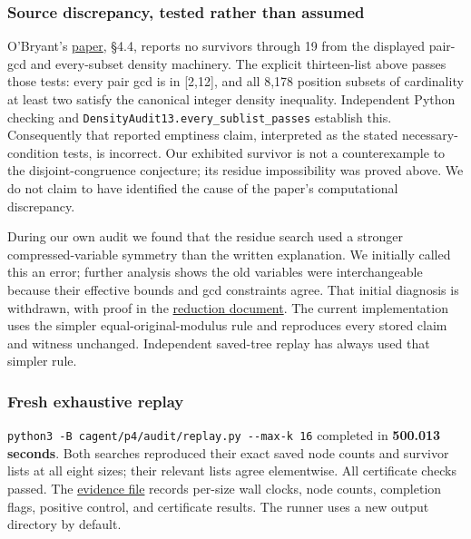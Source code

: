 \documentclass[11pt,a4paper]{article}
\begin{document}
\subsubsection{Source discrepancy, tested rather than assumed}\label{source-discrepancy-tested-rather-than-assumed}

O'Bryant's \href{https://arxiv.org/abs/math/0604347}{paper}, \S{}4.4, reports no survivors through 19 from the displayed pair-gcd and every-subset density machinery. The explicit thirteen-list above passes those tests: every pair gcd is in {[}2,12{]}, and all 8,178 position subsets of cardinality at least two satisfy the canonical integer density inequality. Independent Python checking and \texttt{DensityAudit13.every\_sublist\_passes} establish this. Consequently that reported emptiness claim, interpreted as the stated necessary-condition tests, is incorrect. Our exhibited survivor is not a counterexample to the disjoint-congruence conjecture; its residue impossibility was proved above. We do not claim to have identified the cause of the paper's computational discrepancy.

During our own audit we found that the residue search used a stronger compressed-variable symmetry than the written explanation. We initially called this an error; further analysis shows the old variables were interchangeable because their effective bounds and gcd constraints agree. That initial diagnosis is withdrawn, with proof in the \href{https://github.com/mpelteshki/climbing-to-the-frontier/blob/ed55f76eb8c558825bb629fd2cd8dbf46e5f1314/cagent/p4/audit/reduction-proof.md}{reduction document}. The current implementation uses the simpler equal-original-modulus rule and reproduces every stored claim and witness unchanged. Independent saved-tree replay has always used that simpler rule.

\subsubsection{Fresh exhaustive replay}\label{fresh-exhaustive-replay}

\texttt{python3\ -B\ cagent/p4/audit/replay.py\ -\/-max-k\ 16} completed in \textbf{500.013 seconds}. Both searches reproduced their exact saved node counts and survivor lists at all eight sizes; their relevant lists agree elementwise. All certificate checks passed. The \href{https://github.com/mpelteshki/climbing-to-the-frontier/blob/ed55f76eb8c558825bb629fd2cd8dbf46e5f1314/cagent/p4/audit/rerun-full/replay-evidence-9-16.json}{evidence file} records per-size wall clocks, node counts, completion flags, positive control, and certificate results. The runner uses a new output directory by default.
\end{document}
